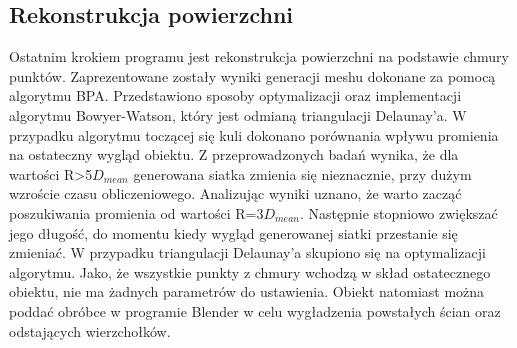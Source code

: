 \subsection{Rekonstrukcja powierzchni}
Ostatnim krokiem programu jest rekonstrukcja powierzchni na podstawie chmury punktów. Zaprezentowane zostały wyniki generacji meshu dokonane za pomocą algorytmu BPA. Przedstawiono sposoby optymalizacji oraz implementacji algorytmu Bowyer-Watson, który jest odmianą triangulacji Delaunay'a. W przypadku algorytmu toczącej się kuli dokonano porównania wpływu promienia na ostateczny wygląd obiektu. Z przeprowadzonych badań wynika, że dla wartości R>5$D_{mean}$ generowana siatka zmienia się nieznacznie, przy dużym wzroście czasu obliczeniowego. Analizując wyniki uznano, że warto zacząć poszukiwania promienia od wartości R=3$D_{mean}$. Następnie stopniowo zwiększać jego długość, do momentu kiedy wygląd generowanej siatki przestanie się zmieniać.
\newline \indent W przypadku triangulacji Delaunay'a skupiono się na optymalizacji algorytmu. Jako, że wszystkie punkty z chmury wchodzą w skład ostatecznego obiektu, nie ma żadnych parametrów do ustawienia. Obiekt natomiast można poddać obróbce w programie Blender w celu wygładzenia powstałych ścian oraz odstających wierzchołków. 

